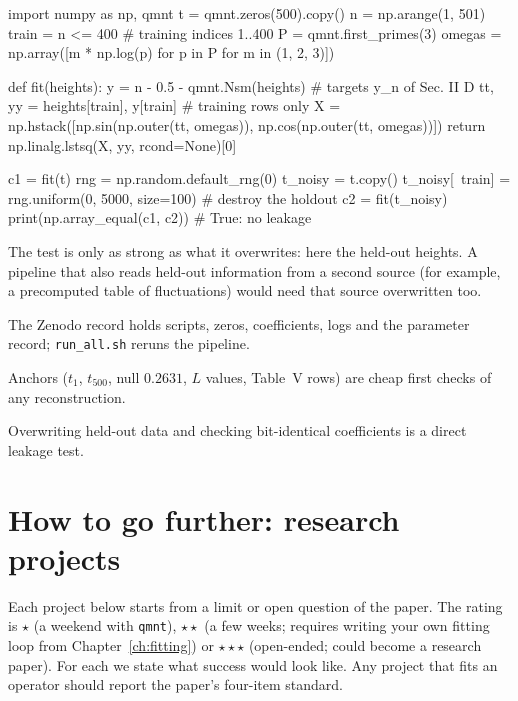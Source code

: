 \begin{pycode}
import numpy as np, qmnt
t = qmnt.zeros(500).copy()
n = np.arange(1, 501)
train = n <= 400                            # training indices 1..400
P = qmnt.first_primes(3)
omegas = np.array([m * np.log(p) for p in P for m in (1, 2, 3)])

def fit(heights):
    y = n - 0.5 - qmnt.Nsm(heights)         # targets y_n of Sec. II D
    tt, yy = heights[train], y[train]       # training rows only
    X = np.hstack([np.sin(np.outer(tt, omegas)),
                   np.cos(np.outer(tt, omegas))])
    return np.linalg.lstsq(X, yy, rcond=None)[0]

c1 = fit(t)
rng = np.random.default_rng(0)
t_noisy = t.copy()
t_noisy[~train] = rng.uniform(0, 5000, size=100)   # destroy the holdout
c2 = fit(t_noisy)
print(np.array_equal(c1, c2))               # True: no leakage
\end{pycode}

The test is only as strong as what it overwrites: here the held-out heights. A pipeline that also reads held-out information from a second source (for example, a precomputed table of fluctuations) would need that source overwritten too.

\begin{keyideas}
\item The Zenodo record holds scripts, zeros, coefficients, logs and the parameter record; \texttt{run\_all.sh} reruns the pipeline.
\item Anchors ($t_1$, $t_{500}$, null $0.2631$, $L$ values, Table~V rows) are cheap first checks of any reconstruction.
\item Overwriting held-out data and checking bit-identical coefficients is a direct leakage test.
\end{keyideas}

\section{How to go further: research projects}\label{sec:paper-critique-projects}

Each project below starts from a limit or open question of the paper. The rating is $\star$ (a weekend with \texttt{qmnt}), $\star\star$ (a few weeks; requires writing your own fitting loop from Chapter~\ref{ch:fitting}) or $\star\star\star$ (open-ended; could become a research paper). For each we state what success would look like. Any project that fits an operator should report the paper's four-item standard.


